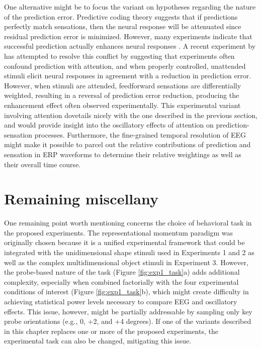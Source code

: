 \documentclass[defaultstyle,12pt]{thesis}
\begin{document}
{One alternative might be to focus the variant on hypotheses regarding the nature of the prediction error. Predictive coding theory suggests that if predictions perfectly match sensations, then the neural response will be attenuated since residual prediction error is minimized. However, many experiments indicate that successful prediction actually enhances neural responses \cite{DohertyRaoMesulamEtAl05,EstermanYantis10}. A recent experiment by  has attempted to resolve this conflict by suggesting that experiments often confound prediction with attention, and when properly controlled, unattended stimuli elicit neural responses in agreement with a reduction in prediction error. However, when stimuli are attended, feedforward sensations are differentially weighted, resulting in a reversal of prediction error reduction, producing the enhancement effect often observed experimentally. This experimental variant involving attention dovetails nicely with the one described in the previous section, and would provide insight into the oscillatory effects of attention on prediction-sensation processes. Furthermore, the fine-grained temporal resolution of EEG might make it possible to parcel out the relative contributions of prediction and sensation in ERP waveforms to determine their relative weightings as well as their overall time course.

\section{Remaining miscellany}
One remaining point worth mentioning concerns the choice of behavioral task in the proposed experiments. The representational momentum paradigm was originally chosen because it is a unified experimental framework that could be integrated with the unidimensional shape stimuli used in Experiments 1 and 2 as well as the complex multidimensional object stimuli in Experiment 3. However, the probe-based nature of the task (Figure \ref{fig:exp1_task}a) adds additional complexity, especially when combined factorially with the four experimental conditions of interest (Figure \ref{fig:exp1_task}b), which might create difficulty in achieving statistical power levels necessary to compare EEG and oscillatory effects. This issue, however, might be partially addressable by sampling only key probe orientations (e.g., 0, +2, and +4 degrees). If one of the variants described in this chapter replaces one or more of the proposed experiments, the experimental task can also be changed, mitigating this issue.

}
\end{document}
